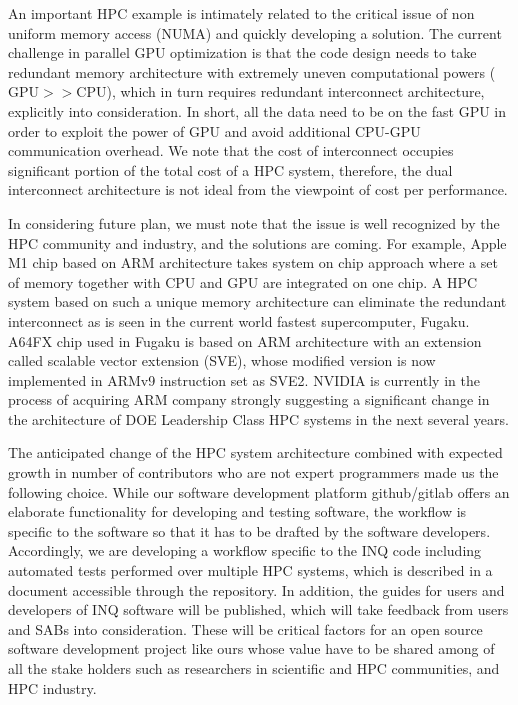 An important HPC example is intimately related to the critical issue of non uniform memory access (NUMA) and quickly developing a solution. 
The current challenge in parallel GPU optimization is that the code design needs to take redundant memory architecture with extremely uneven computational powers (\(\mathrm{GPU} >> \mathrm{CPU}\)), which in turn requires redundant interconnect architecture, explicitly into consideration.
In short, all the data need to be on the fast GPU in order to exploit the power of GPU and avoid additional CPU-GPU communication overhead.
We note that the cost of interconnect occupies significant portion of the total cost of a HPC system, therefore, the dual interconnect architecture is not ideal from the viewpoint of cost per performance.

In considering future plan, we must note that the issue is well recognized by the HPC community and industry, and the solutions are coming. 
For example, Apple M1 chip based on ARM architecture takes system on chip approach where a set of memory together with CPU and GPU are integrated on one chip. 
A HPC system based on such a unique memory architecture can eliminate the redundant interconnect as is seen in the current world fastest supercomputer, Fugaku. 
A64FX chip used in Fugaku is based on ARM architecture with an extension called scalable vector extension (SVE), whose modified version is now implemented in ARMv9 instruction set as SVE2. NVIDIA is currently in the process of acquiring ARM company strongly suggesting a significant change in the architecture of DOE Leadership Class HPC systems in the next several years.

The anticipated change of the HPC system architecture combined with expected growth in number of contributors who are not expert programmers made us the following choice. 
While our software development platform github/gitlab offers an elaborate functionality for developing and testing software, the workflow is specific to the software so that it has to be drafted by the software developers. 
Accordingly, we are developing a workflow specific to the INQ code including automated tests performed over multiple HPC systems, which is described in a document accessible through the repository. 
In addition, the guides for users and developers of INQ software will be published, which will take feedback from users and SABs into consideration. 
These will be critical factors for an open source software development project like ours whose value have to be shared among of all the stake holders such as researchers in scientific and HPC communities, and HPC industry.

